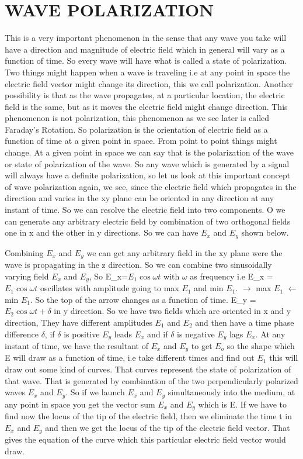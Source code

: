 \section{WAVE POLARIZATION}
This is a very important phenomenon in the sense that any wave you take will have a direction and magnitude of electric field which in general will vary as a function of time. So every wave will have what is called a state of polarization. Two things might happen when a wave is traveling i.e at any point in space the electric field vector might change its direction, this we call polarization. Another possibility is that as the wave propagates, at a particular location, the electric field is the same, but as it moves the electric field might change direction. This phenomenon is not polarization, this phenomenon as we see later is called Faraday's Rotation. So polarization is the orientation of electric field as a function of time at a given point in space. From point to point things might change.  At a given point in space we can say that is the polarization of the wave or state of polarization of the wave. So any wave which is generated by a signal will always have a definite polarization, so let  us look at this important concept of wave polarization again, we  see, since the electric field which propagates in the direction and varies in the xy plane can be oriented in any direction at any instant of time. So we can resolve the electric field into two components. O we can generate any arbitrary electric field by combination of two orthogonal fields one in x and the other in y directions. So we can  have $E_x$ and $E_y$ shown below. 

Combining $E_x$ and $E_y$ we can get any arbitrary field in the xy plane were the wave is propagating in the z direction. So we can combine two sinusoidally varying field $E_x$ and $E_y$, So E_x=$E_{1}\cos\omega t$ with $\omega$ as frequency i.e E_x = $E_{1}\cos\omega t$ oscillates with amplitude going to max $E_{1}$ and min $E_{1}$. $\longrightarrow$ max $E_{1}$ $\longleftarrow$ min $E_{1}$. So the top of the arrow changes as a function of time. E_y  = $E_{2}\cos\omega t + \delta$ in y direction. So we have two fields which are oriented in x and y direction, They have different amplitudes $E_{1}$ and $E_{2}$ and then have a time phase difference $\delta$, if $\delta$ is positive $E_y$ leads $E_x$ and if $\delta$ is negative $E_y$ lags $E_x$. At any instant of time, we have the resultant of $E_x$ and $E_y$ to get $E_{o}$ so the shape which E will draw as a function of time, i.e take different times and find out $E_{1}$ this will draw out some kind of curves. That curves represent the state of polarization of that wave. That is generated by combination of the two perpendicularly polarized waves $E_x$ and $E_y$. So if we launch $E_x$ and $E_y$ simultaneously into the medium, at any point in space you get the vector sum $E_x$ and $E_y$ which is E. If we have to find now the locus of the tip of the electric field, then we eliminate the time t in $E_x$ and $E_y$ and then we get the locus of the tip of the electric field vector. That gives the equation of the curve which this particular electric field vector would draw.

